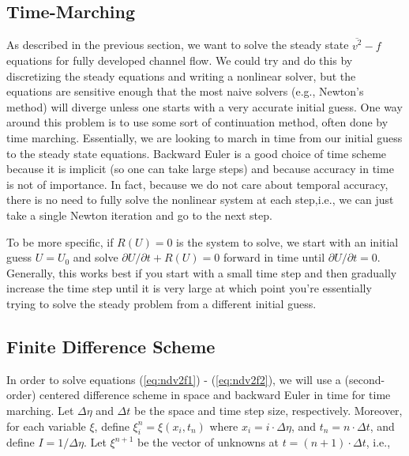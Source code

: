 \documentclass[12pt]{article}
\newcommand{\pr}{\partial}
\begin{document}
\subsection{Time-Marching} 

As described in the previous section, we want to solve the steady state
$\overline{v^2}-f$ equations for fully developed channel flow. We could try and
do this by discretizing the steady equations and writing a nonlinear solver, but
the equations are sensitive enough that the most naive solvers (e.g., Newton's
method) will diverge unless one starts with a very accurate initial guess. One
way around this problem is to use some sort of continuation method, often done
by time marching. Essentially, we are looking to march in time from our initial
guess to the steady state equations. Backward Euler is a good choice of time
scheme because it is implicit (so one can take large steps) and because accuracy
in time is not of importance. In fact, because we do not care about temporal
accuracy, there is no need to fully solve the nonlinear system at each
step,i.e., we can just take a single Newton iteration and go to the next step.
\cite{todd}

To be more specific, if $R(U)=0$ is the system to solve, we start with an
initial guess $U = U_0$ and solve $\pr U / \pr t + R(U) = 0$ forward in time
until $\pr U/\pr t = 0$. Generally, this works best if you start with a small
time step and then gradually increase the time step until it is very large at
which point you're essentially trying to solve the steady problem from a
different initial guess. \cite{todd} 

\subsection{Finite Difference Scheme}

In order to solve equations (\ref{eq:ndv2f1}) - (\ref{eq:ndv2f2}), we will use a
(second-order) centered difference scheme in space and backward Euler in time
for time marching. Let $\Delta \eta$ and $\Delta t$ be the space and time step
size, respectively. Moreover, for each variable $\xi$, define $\xi_i^n = \xi(x_i,t_n)$ where $x_i = i
\cdot\Delta \eta$, and $t_n = n\cdot\Delta t$, and define $I = 1/\Delta \eta$.
Let $\xi^{n+1}$ be the vector of unknowns at $t = (n+1) \cdot \Delta t$, i.e., 
\end{document}
